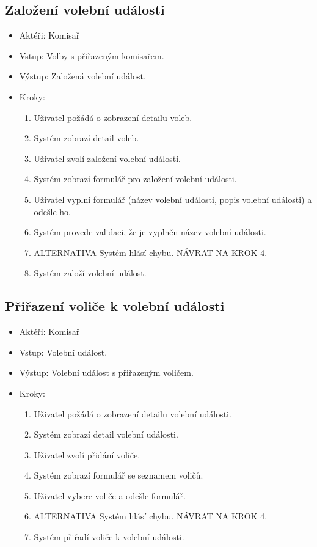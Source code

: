\documentclass[11pt,twoside,a4paper]{book}
\begin{document}
\subsection{Založení volební události}

\begin{itemize}
\item Aktéři: Komisař
\item Vstup: Volby s přiřazeným komisařem.
\item Výstup: Založená volební událost.
\item Kroky:
	\begin{enumerate}
		\item Uživatel požádá o zobrazení detailu voleb.
		\item Systém zobrazí detail voleb.
		\item Uživatel zvolí založení volební události.
		\item Systém zobrazí formulář pro založení volební události.
		\item Uživatel vyplní formulář (název volební události, popis volební události) a odešle ho.
		\item Systém provede validaci, že je vyplněn název volební události.
		\item ALTERNATIVA Systém hlásí chybu. NÁVRAT NA KROK 4.
		\item Systém založí volební událost.
	\end{enumerate}
\end{itemize}

\subsection{Přiřazení voliče k volební události}

\begin{itemize}
\item Aktéři: Komisař
\item Vstup: Volební událost.
\item Výstup: Volební událost s přiřazeným voličem.
\item Kroky:
	\begin{enumerate}
		\item Uživatel požádá o zobrazení detailu volební události.
		\item Systém zobrazí detail volební události.
		\item Uživatel zvolí přidání voliče.
		\item Systém zobrazí formulář se seznamem voličů.
		\item Uživatel vybere voliče a odešle formulář.		
		\item ALTERNATIVA Systém hlásí chybu. NÁVRAT NA KROK 4.
		\item Systém přiřadí voliče k volební události.
	\end{enumerate}
\end{itemize}
\end{document}
